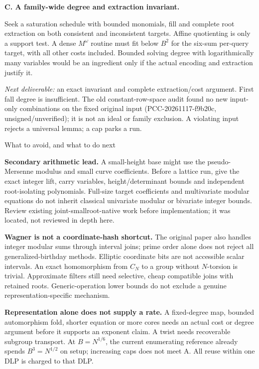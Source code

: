 \documentclass[10pt]{article}
\begin{document}
\textbf{C. A family-wide degree and extraction invariant.}

Seek a saturation schedule with bounded monomials, fill and complete root
extraction on both consistent and inconsistent targets. Affine quotienting
is only a support test. A dense $M^\omega$ routine must fit below $B^2$ for
the six-sum per-query target, with all other costs included. Bounded solving
degree with logarithmically many variables would be an ingredient only if
the actual encoding and extraction justify it.

\emph{Next deliverable:} an exact invariant and complete extraction/cost
argument. First fall degree is insufficient. The old constant-row-space
audit found no new input-only combinations on the fixed original input
(PCC-20261117-f9b20c, unsigned/unverified); it is not an ideal or family
exclusion. A violating input rejects a universal lemma; a cap parks a run.

\newpage
{\Large What to avoid, and what to do next}\par
\textbf{Secondary arithmetic lead.} A small-height base might use the
pseudo-Mersenne modulus and small curve coefficients. Before a lattice run,
give the exact integer lift, carry variables, height/determinant bounds and
independent root-isolating polynomials. Full-size target coefficients and
multivariate modular equations do not inherit classical univariate modular
or bivariate integer bounds. Review existing joint-smallroot-native work
before implementation; it was located, not reviewed in depth here.

\textbf{Wagner is not a coordinate-hash shortcut.} The original paper also
handles integer modular sums through interval joins; prime order alone does
not reject all generalized-birthday methods. Elliptic coordinate bits are
not accessible scalar intervals. An exact homomorphism from $C_N$ to a group
without $N$-torsion is trivial. Approximate filters still need selective,
cheap compatible joins with retained roots. Generic-operation lower bounds
do not exclude a genuine representation-specific mechanism.

\textbf{Representation alone does not supply a rate.} A fixed-degree map,
bounded automorphism fold, shorter equation or more cores needs an actual
cost or degree argument before it supports an exponent claim. A twist needs
recoverable subgroup transport. At $B=N^{1/6}$, the current enumerating
reference already spends $B^3=N^{1/2}$ on setup; increasing caps does not
meet A. All reuse within one DLP is charged to that DLP.
\end{document}

